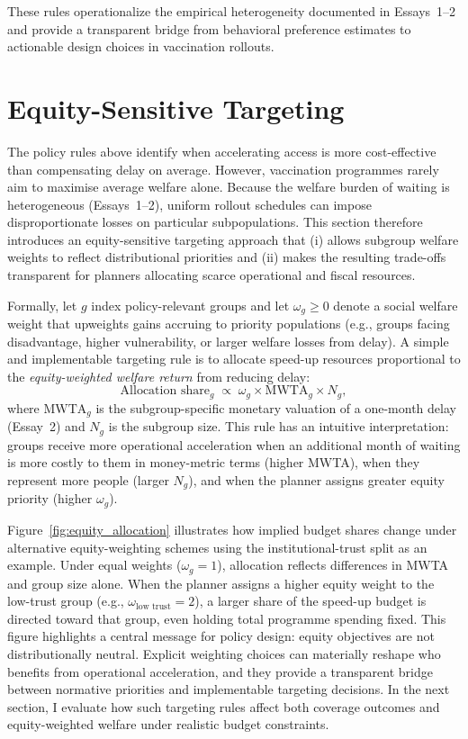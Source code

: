 \documentclass[doublespacing]{utdthesis}
\begin{document}
These rules operationalize the empirical heterogeneity documented in Essays~1--2 and provide a transparent bridge from behavioral preference estimates to actionable design choices in vaccination rollouts.


\section{Equity-Sensitive Targeting}
\label{sec:essay3_equity}

The policy rules above identify when accelerating access is more cost-effective than compensating delay on average. However, vaccination programmes rarely aim to maximise average welfare alone. Because the welfare burden of waiting is heterogeneous (Essays~1--2), uniform rollout schedules can impose disproportionate losses on particular subpopulations. This section therefore introduces an equity-sensitive targeting approach that (i) allows subgroup welfare weights to reflect distributional priorities and (ii) makes the resulting trade-offs transparent for planners allocating scarce operational and fiscal resources.

Formally, let $g$ index policy-relevant groups and let $\omega_g \ge 0$ denote a social welfare weight that upweights gains accruing to priority populations (e.g., groups facing disadvantage, higher vulnerability, or larger welfare losses from delay). A simple and implementable targeting rule is to allocate speed-up resources proportional to the \emph{equity-weighted welfare return} from reducing delay:
\begin{equation}
\text{Allocation share}_g \;\propto\; \omega_g \times \text{MWTA}_g \times N_g,
\label{eq:equity_allocation_rule}
\end{equation}
where $\text{MWTA}_g$ is the subgroup-specific monetary valuation of a one-month delay (Essay~2) and $N_g$ is the subgroup size. This rule has an intuitive interpretation: groups receive more operational acceleration when an additional month of waiting is more costly to them in money-metric terms (higher MWTA), when they represent more people (larger $N_g$), and when the planner assigns greater equity priority (higher $\omega_g$).

Figure~\ref{fig:equity_allocation} illustrates how implied budget shares change under alternative equity-weighting schemes using the institutional-trust split as an example. Under equal weights ($\omega_g=1$), allocation reflects differences in MWTA and group size alone. When the planner assigns a higher equity weight to the low-trust group (e.g., $\omega_{\text{low trust}}=2$), a larger share of the speed-up budget is directed toward that group, even holding total programme spending fixed. This figure highlights a central message for policy design: equity objectives are not distributionally neutral. Explicit weighting choices can materially reshape who benefits from operational acceleration, and they provide a transparent bridge between normative priorities and implementable targeting decisions. In the next section, I evaluate how such targeting rules affect both coverage outcomes and equity-weighted welfare under realistic budget constraints.
\end{document}
